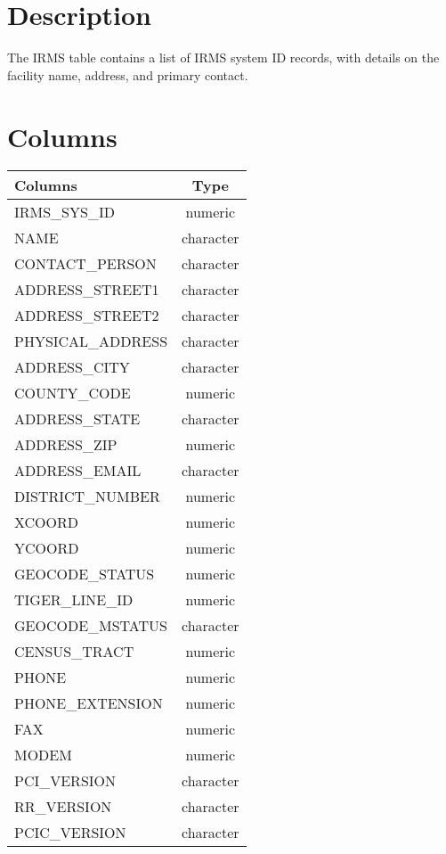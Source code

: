 \documentclass[
  letterpaper,
  DIV=11,
  numbers=noendperiod]{scrreprt}
\begin{document}
\hypertarget{description-15}{%
\section*{Description}\label{description-15}}

The IRMS table contains a list of IRMS system ID records, with details
on the facility name, address, and primary contact.

\hypertarget{columns-15}{%
\section*{Columns}\label{columns-15}}

\begin{longtable}{lc}
\toprule
Columns & Type \\ 
\midrule
IRMS\_SYS\_ID & numeric \\ 
NAME & character \\ 
CONTACT\_PERSON & character \\ 
ADDRESS\_STREET1 & character \\ 
ADDRESS\_STREET2 & character \\ 
PHYSICAL\_ADDRESS & character \\ 
ADDRESS\_CITY & character \\ 
COUNTY\_CODE & numeric \\ 
ADDRESS\_STATE & character \\ 
ADDRESS\_ZIP & numeric \\ 
ADDRESS\_EMAIL & character \\ 
DISTRICT\_NUMBER & numeric \\ 
XCOORD & numeric \\ 
YCOORD & numeric \\ 
GEOCODE\_STATUS & numeric \\ 
TIGER\_LINE\_ID & numeric \\ 
GEOCODE\_MSTATUS & character \\ 
CENSUS\_TRACT & numeric \\ 
PHONE & numeric \\ 
PHONE\_EXTENSION & numeric \\ 
FAX & numeric \\ 
MODEM & numeric \\ 
PCI\_VERSION & character \\ 
RR\_VERSION & character \\ 
PCIC\_VERSION & character \\ 

\end{longtable}
\end{document}

